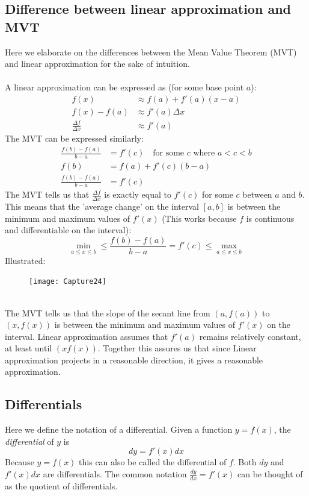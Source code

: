 \documentclass{report}
\begin{document}
\subsection{Difference between linear approximation and MVT} %
Here we elaborate on the differences between the Mean Value Theorem (MVT) and linear approximation for the sake of intuition.\\
\vspace{1mm}\\
A linear approximation can be expressed as (for some base point $a$):
\begin{align*}
f(x)&\approx f(a)+f'(a)(x-a)\\
f(x)-f(a)&\approx f'(a)\Delta x\\
\frac{\Delta f}{\Delta x}&\approx f'(a)
\end{align*}
The MVT can be expressed similarly:
\begin{align*}
\frac{f(b)-f(a)}{b-a}&=f'(c)\quad\text{for some $c$ where $a<c<b$}\\
f(b)&=f(a)+f'(c)(b-a)\\
\frac{f(b)-f(a)}{b-a}&=f'(c)
\end{align*}
The MVT tells us that $\frac{\Delta f}{\Delta x}$ is exactly equal to $f'(c)$ for some $c$ between $a$ and $b$. 
This means that the 'average change' on the interval $[a,b]$ is between the
 minimum and maximum values of $f'(x)$ (This works because $f$ is continuous and
differentiable on the interval):
\begin{equation*}
\min_{a\leq x\leq b}\leq \frac{f(b)-f(a)}{b-a}=f'(c)\leq \max_{a\leq x\leq b}
\end{equation*}
Illustrated:
\begin{figure}[h]
\texttt{[image: Capture24]}\\
\centering
{}
\end{figure}\\
The MVT tells us that the slope of the secant line from $(a,f(a))$ to $(x,f(x))$ is 
between the minimum and maximum values of $f'(x)$ on the interval.
Linear approximation assumes that $f'(a)$ remains relatively constant, at least
until $(x f(x))$. Together this assures us that since Linear approximation projects
in a reasonable direction, it gives a reasonable approximation.
\newpage

\subsection{Differentials} %
Here we define the notation of a differential. Given a function 
$y=f(x)$, the \textit{differential} of $y$ is
\begin{equation*}
dy=f'(x)dx
\end{equation*}
Because $y=f(x)$ this can also be called the differential of $f$. 
Both $dy$ and $f'(x)dx$ are differentials. The common notation $\frac{dy}{dx}=f'(x)$ can
be thought of as the quotient of differentials.
\newpage
\end{document}

